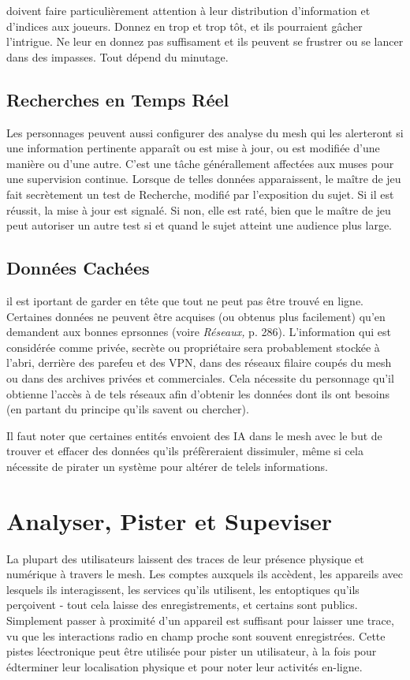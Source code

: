 doivent faire particulièrement attention à leur distribution d'information et d'indices aux joueurs. Donnez en trop et trop tôt, et ils pourraient gâcher l'intrigue. Ne leur en donnez pas suffisament et ils peuvent se frustrer ou se lancer dans des impasses. Tout dépend du minutage. 

\subsection{Recherches en Temps Réel} 

Les personnages peuvent aussi configurer des analyse du mesh qui les alerteront si une information pertinente apparaît ou est mise à jour, ou est modifiée d'une manière ou d'une autre. C'est une tâche générallement affectées aux muses pour une supervision continue. Lorsque de telles données apparaissent, le maître de jeu fait secrètement un test de Recherche, modifié par l'exposition du sujet. Si il est réussit, la mise à jour est signalé. Si non, elle est raté, bien que le maître de jeu peut autoriser un autre test si et quand le sujet atteint une audience plus large. 

\subsection{Données Cachées} 

il est iportant de garder en tête que tout ne peut pas être trouvé en ligne. Certaines données ne peuvent être acquises (ou obtenus plus facilement) qu'en demandent aux bonnes eprsonnes (voire \textit{Réseaux, } p. 286). L'information qui est considérée comme privée, secrète ou propriétaire sera probablement stockée à l'abri, derrière des parefeu et des VPN, dans des réseaux filaire coupés du mesh ou dans des archives privées et commerciales. Cela nécessite du personnage qu'il obtienne l'accès à de tels réseaux afin d'obtenir les données dont ils ont besoins (en partant du principe qu'ils savent ou chercher). 

Il faut noter que certaines entités envoient des IA dans le mesh avec le but de trouver et effacer des données qu'ils préfèreraient dissimuler, même si cela nécessite de pirater un système pour altérer de telels informations. 

\section{Analyser, Pister et Supeviser} 

La plupart des utilisateurs laissent des traces de leur présence physique et numérique à travers le mesh. Les comptes auxquels ils accèdent, les appareils avec lesquels ils interagissent, les services qu'ils utilisent, les entoptiques qu'ils perçoivent - tout cela laisse des enregistrements, et certains sont publics. Simplement passer à proximité d'un appareil est suffisant pour laisser une trace, vu que les interactions radio en champ proche sont souvent enregistrées. Cette pistes léectronique peut être utilisée pour pister un utilisateur, à la fois pour édterminer leur localisation physique et pour noter leur activités en-ligne. 

